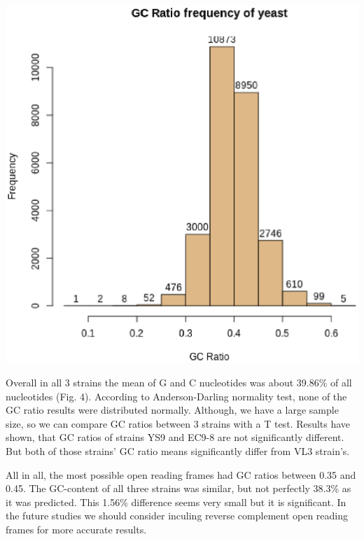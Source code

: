 \documentclass{article}
\begin{document}
\begin{minipage}{0.5\textwidth}
\includegraphics[width=\textwidth]{images/AllGenomes.eps}
\end{minipage}
\begin{minipage}{0.5\textwidth}
Overall in all 3 strains the mean of G and C nucleotides was about 39.86\% of all nucleotides (Fig. 4). 
According to Anderson-Darling normality test, none of the GC ratio results were distributed normally. Although, we have a large sample size, so we can compare GC ratios between 3 strains with a T test. Results have shown, that GC ratios of strains YS9 and 
EC9-8 are not significantly different. But both of those strains' GC ratio means significantly differ from VL3 strain's.
\vspace{1cm}\\

\end{minipage}

\bigskip
All in all, the most possible open reading frames had GC ratios between 0.35 and 0.45. The GC-content of all three strains was similar, but not perfectly 38.3\% as it was predicted. This 1.56\% difference seems very small but it is significant. In the future studies we should consider inculing reverse complement open reading frames for more accurate results.
\end{document}
